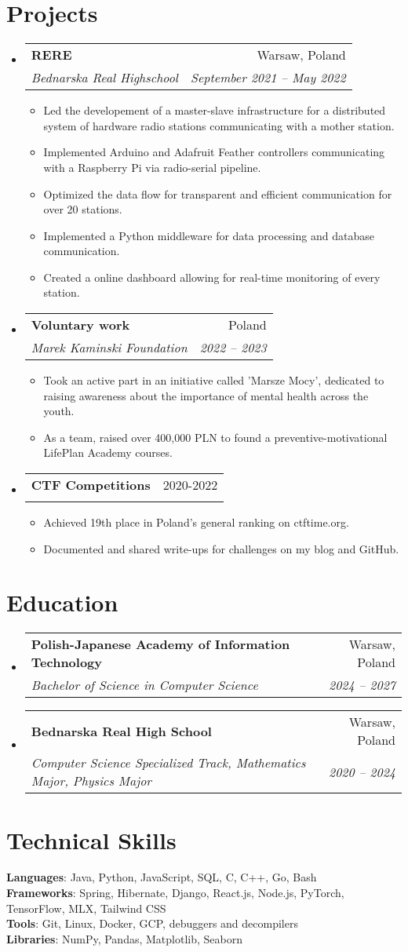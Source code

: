 \documentclass[letterpaper,11pt]{article}
\makeatletter
\newcommand{\resumeItem}[1]{
  \item\small{
    {#1 \vspace{-2pt}}
  }
}
\newcommand{\resumeSubheading}[4]{
  \vspace{-2pt}\item
    \begin{tabular*}{0.97\textwidth}[t]{l@{\extracolsep{\fill}}r}
      \textbf{#1} & #2 \\
      \textit{\small#3} & \textit{\small #4} \\
    \end{tabular*}\vspace{-7pt}
}
\newcommand{\resumeSubHeadingListStart}{\begin{itemize}[leftmargin=0.15in, label={}]}
\newcommand{\resumeSubHeadingListEnd}{\end{itemize}}
\newcommand{\resumeItemListStart}{\begin{itemize}}
\newcommand{\resumeItemListEnd}{\end{itemize}\vspace{-5pt}}
\makeatother
\begin{document}
\section{Projects}
  \resumeSubHeadingListStart
    \resumeSubheading
      {RERE}{Warsaw, Poland}
      {Bednarska Real Highschool}{September 2021 -- May 2022}
      \resumeItemListStart
        \resumeItem{Led the developement of a master-slave infrastructure for a distributed system of hardware radio stations communicating with a mother station.}
        \resumeItem{Implemented Arduino and Adafruit Feather controllers communicating with a Raspberry Pi via radio-serial pipeline.}
        \resumeItem{Optimized the data flow for transparent and efficient communication for over 20 stations.}
        \resumeItem{Implemented a Python middleware for data processing and database communication.}
        \resumeItem{Created a online dashboard allowing for real-time monitoring of every station.}
      \resumeItemListEnd
    \resumeSubheading
      {Voluntary work}{Poland}
      {Marek Kaminski Foundation}{2022 -- 2023}
      \resumeItemListStart
        \resumeItem{Took an active part in an initiative called 'Marsze Mocy', dedicated to raising awareness about the importance of mental health across the youth.}
        \resumeItem{As a team, raised over 400,000 PLN to found a preventive-motivational LifePlan Academy courses.}
      \resumeItemListEnd
    \resumeSubheading
      {CTF Competitions}{2020-2022}
      {}{}
      \resumeItemListStart
        \resumeItem{Achieved 19th place in Poland's general ranking on ctftime.org.}
        \resumeItem{Documented and shared write-ups for challenges on my blog and GitHub.}
      \resumeItemListEnd
  \resumeSubHeadingListEnd

\section{Education}
    \resumeSubHeadingListStart
      \resumeSubheading
        {Polish-Japanese Academy of Information Technology}{Warsaw, Poland}
        {Bachelor of Science in Computer Science}{2024 -- 2027}
      \resumeSubheading
        {Bednarska Real High School}{Warsaw, Poland}
        {Computer Science Specialized Track, Mathematics Major, Physics Major}{2020 -- 2024}
  \resumeSubHeadingListEnd


\section{Technical Skills}
  \begin{itemize}[leftmargin=0.15in, label={}]
    \small{\item{
      \textbf{Languages}{: Java, Python, JavaScript, SQL, C, C++, Go, Bash} \\
      \textbf{Frameworks}{: Spring, Hibernate, Django, React.js, Node.js, PyTorch, TensorFlow, MLX, Tailwind CSS} \\
      \textbf{Tools}{: Git, Linux, Docker, GCP, debuggers and decompilers} \\
      \textbf{Libraries}{: NumPy, Pandas, Matplotlib, Seaborn} \\
    }}
  \end{itemize}

  
\end{document}
